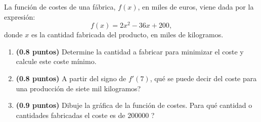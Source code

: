 
La función de costes de una fábrica, $f(x)$, en miles de euros, viene dada por la expresión:
\[
f(x)=2x^2-36x+200,
\]
donde $x$ es la cantidad fabricada del producto, en miles de kilogramos.
\begin{enumerate}[label=\alph*)]
\item \textbf{(0.8 puntos)} Determine la cantidad a fabricar para minimizar el coste y calcule este coste mínimo.
\item \textbf{(0.8 puntos)} A partir del signo de $f'(7)$, \textquestiondown{}qué se puede decir del coste para una producción de siete mil kilogramos?
\item \textbf{(0.9 puntos)} Dibuje la gráfica de la función de costes. \textquestiondown{}Para qué cantidad o cantidades fabricadas el coste es de 200000 \texteuro{}?
\end{enumerate}
